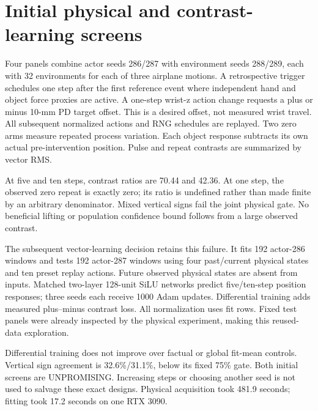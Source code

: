 \documentclass[10pt]{article}
\begin{document}
\section{Initial physical and contrast-learning screens}
Four panels combine actor seeds 286/287 with environment seeds 288/289, each with
32 environments for each of three airplane motions. A retrospective trigger schedules
one step after the first reference event where independent hand and object force
proxies are active. A one-step wrist-z action change requests a plus or minus 10-mm
PD target offset. This is a desired offset, not measured wrist travel. All subsequent
normalized actions and RNG schedules are replayed. Two zero arms measure repeated
process variation. Each object response subtracts its own actual pre-intervention
position. Pulse and repeat contrasts are summarized by vector RMS.

\begin{table}[h]
\centering

\caption{Initial fixed panels: pulse versus observed zero-repeat position contrasts.}
\end{table}

At five and ten steps, contrast ratios are 70.44 and 42.36. At one step, the observed
zero repeat is exactly zero; its ratio is undefined rather than made finite by an
arbitrary denominator. Mixed vertical signs fail the joint physical gate. No beneficial
lifting or population confidence bound follows from a large observed contrast.

The subsequent vector-learning decision retains this failure. It fits 192 actor-286
windows and tests 192 actor-287 windows using four past/current physical states and
ten preset replay actions. Future observed physical states are absent from inputs.
Matched two-layer 128-unit SiLU networks predict five/ten-step position responses;
three seeds each receive 1000 Adam updates. Differential training adds measured
plus--minus contrast loss. All normalization uses fit rows. Fixed test panels were
already inspected by the physical experiment, making this reused-data exploration.

\begin{table}[h]
\centering

\caption{Actor-transfer contrast RMSE, millimeters; learned rows average three optimization seeds.}
\end{table}

Differential training does not improve over factual or global fit-mean controls.
Vertical sign agreement is 32.6\%/31.1\%, below its fixed 75\% gate. Both initial
screens are UNPROMISING. Increasing steps or choosing another seed is not used to
salvage these exact designs. Physical acquisition took 481.9 seconds; fitting took
17.2 seconds on one RTX 3090.
\end{document}
